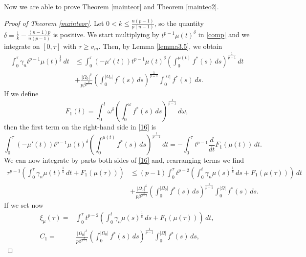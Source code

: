 \documentclass[12pt]{article}
\newcommand{\abs}[1]{{\left|#1\right|}}
\theoremstyle{definition}
\theoremstyle{plain}
\theoremstyle{definition}
\begin{document}
Now we are able to prove Theorem \ref{mainteor} and Theorem \ref{mainteo2}.
\begin{proof}[Proof of Theorem \ref{mainteor}]
    Let $0<k\leq \frac{n(p-1)}{p(n-1)}$, so the quantity $\delta=\frac{1}{k}-\frac{(n-1)p}{n(p-1)}$ is positive. We start multiplying by $t^{p-1}\mu(t)^\delta$ in \eqref{comp} and we integrate on $[0,\tau]$ with $\tau\geq v_m$. Then, by Lemma \ref{lemma3.5}, we obtain
    \begin{equation}\label{16}
    \begin{split}
        \int_0^\tau \gamma_n t^{p-1}\mu(t)^\frac{1}{k}\,dt&\leq \int_0^\tau (-\mu'(t))t^{p-1}\mu(t)^\delta\left(\int_0^{\mu(t)}f^*(s)\,ds \right)^\frac{1}{p-1}\,dt\\&+\frac{\abs{\Omega_0}^\delta}{p\beta^\frac{p}{p-1}}\left(\int_0^\abs{\Omega_0}f^*(s)\,ds \right)^\frac{1}{p-1}\int_0^{\abs{\Omega}}f^*(s)\,ds.
   \end{split}
    \end{equation}
    If we define
    \begin{equation*}
        F_1(l)=\int_0^l \omega^\delta\left(\int_0^\omega f^*(s)\,ds\right)^\frac{1}{p-1}\,d\omega,
    \end{equation*}
    then the first term on the right-hand side in \eqref{16} is
    \begin{equation*}
        \int_0^\tau (-\mu'(t))t^{p-1}\mu(t)^\delta\left(\int_0^{\mu(t)}f^*(s)\,ds \right)^\frac{1}{p-1}\,dt=-\int_0^\tau t^{p-1}\frac{d}{dt}F_1(\mu(t))\,dt.
    \end{equation*}
    We can now integrate by parts both sides of \eqref{16} and, rearranging terms we find
    \begin{equation*}
        \begin{split}
            \tau^{p-1}\left(\int_0^\tau \gamma_n \mu(t)^\frac{1}{k}\,dt+F_1(\mu(\tau))\right)&\leq (p-1)\int_0^\tau t^{p-2}\left(\int_0^t \gamma_n \mu(s)^\frac{1}{k}\,ds+F_1(\mu(\tau))\right)\,dt\\
            &+\frac{\abs{\Omega_0}^\delta}{p\beta^\frac{p}{p-1}}\left(\int_0^\abs{\Omega_0}f^*(s)\,ds \right)^\frac{1}{p-1}\int_0^{\abs{\Omega}}f^*(s)\,ds.
        \end{split}
    \end{equation*}
    If we set now
    \begin{equation*}
    \begin{split}
        \xi_\mu(\tau)=&\int_0^\tau t^{p-2}\left(\int_0^t \gamma_n \mu(s)^\frac{1}{k}\,ds+F_1(\mu(\tau))\right)\,dt,\\ C_1=&\frac{\abs{\Omega_0}^\delta}{p\beta^\frac{p}{p-1}}\left(\int_0^\abs{\Omega_0}f^*(s)\,ds \right)^\frac{1}{p-1}\int_0^{\abs{\Omega}}f^*(s)\,ds,

\end{split}
\end{equation*}
\end{proof}
\end{document}
